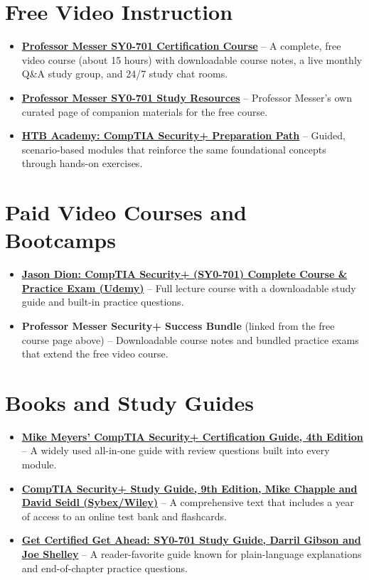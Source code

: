 \documentclass[11pt,letterpaper]{article}
\begin{document}
\section{Free Video Instruction}
\begin{itemize}
\item \textbf{\href{https://www.professormesser.com/sy0-701-certification-course/}{Professor Messer SY0-701 Certification Course}} -- A complete, free video course (about 15 hours) with downloadable course notes, a live monthly Q\&A study group, and 24/7 study chat rooms.
\item \textbf{\href{https://www.professormesser.com/sy0-701-secplus-resources/}{Professor Messer SY0-701 Study Resources}} -- Professor Messer's own curated page of companion materials for the free course.
\item \textbf{\href{https://academy.hackthebox.com/path/preview/comptia-security-preparation}{HTB Academy: CompTIA Security+ Preparation Path}} -- Guided, scenario-based modules that reinforce the same foundational concepts through hands-on exercises.
\end{itemize}

\section{Paid Video Courses and Bootcamps}
\begin{itemize}
\item \textbf{\href{https://www.udemy.com/course/securityplus/}{Jason Dion: CompTIA Security+ (SY0-701) Complete Course \& Practice Exam (Udemy)}} -- Full lecture course with a downloadable study guide and built-in practice questions.
\item \textbf{Professor Messer Security+ Success Bundle} (linked from the free course page above) -- Downloadable course notes and bundled practice exams that extend the free video course.
\end{itemize}

\section{Books and Study Guides}
\begin{itemize}
\item \textbf{\href{https://www.amazon.com/Meyers-CompTIA-Security-Certification-SY0-701/dp/1265684189}{Mike Meyers' CompTIA Security+ Certification Guide, 4th Edition}} -- A widely used all-in-one guide with review questions built into every module.
\item \textbf{\href{https://www.wiley.com/en-us/CompTIA+Security++Study+Guide+with+over+500+Practice+Test+Questions:+Exam+SY0-701,+9th+Edition-p-9781394211418}{CompTIA Security+ Study Guide, 9th Edition, Mike Chapple and David Seidl (Sybex/Wiley)}} -- A comprehensive text that includes a year of access to an online test bank and flashcards.
\item \textbf{\href{https://www.amazon.com/CompTIA-Security-Get-Certified-Ahead/dp/B0CMZC4YRR}{Get Certified Get Ahead: SY0-701 Study Guide, Darril Gibson and Joe Shelley}} -- A reader-favorite guide known for plain-language explanations and end-of-chapter practice questions.
\end{itemize}
\end{document}
